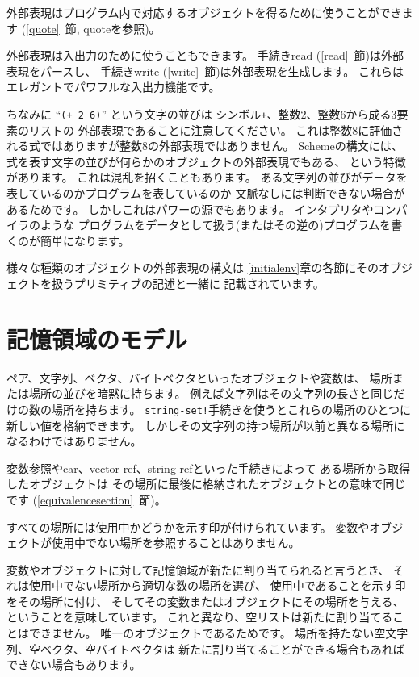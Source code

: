 外部表現はプログラム内で対応するオブジェクトを得るために使うことができます
(\ref{quote}~節, {\cf quote}を参照)。

外部表現は入出力のために使うこともできます。
手続き{\cf read} (\ref{read}~節)は外部表現をパースし、
手続き{\cf write} (\ref{write}~節)は外部表現を生成します。
これらはエレガントでパワフルな入出力機能です。

ちなみに ``{\tt(+ 2 6)}'' という文字の並びは
シンボル{\tt +}、整数2、整数6から成る3要素のリストの
外部表現であることに注意してください。
これは整数8に評価される式ではありますが整数8の外部表現ではありません。
Schemeの構文には、式を表す文字の並びが何らかのオブジェクトの外部表現でもある、
という特徴があります。
これは混乱を招くこともあります。
ある文字列の並びがデータを表しているのかプログラムを表しているのか
文脈なしには判断できない場合があるためです。
しかしこれはパワーの源でもあります。
インタプリタやコンパイラのような
プログラムをデータとして扱う(またはその逆の)プログラムを書くのが簡単になります。

様々な種類のオブジェクトの外部表現の構文は
\ref{initialenv}章の各節にそのオブジェクトを扱うプリミティブの記述と一緒に
記載されています。

\section{記憶領域のモデル}
\label{storagemodel}

ペア、文字列、ベクタ、バイトベクタといったオブジェクトや変数は、
場所または場所の並びを暗黙に持ちます。
例えば文字列はその文字列の長さと同じだけの数の場所を持ちます。
{\tt string-set!}手続きを使うとこれらの場所のひとつに新しい値を格納できます。
しかしその文字列の持つ場所が以前と異なる場所になるわけではありません。

変数参照や{\cf car}、{\cf vector-ref}、{\cf string-ref}といった手続きによって
ある場所から取得したオブジェクトは
その場所に最後に格納されたオブジェクトとの意味で同じです
(\ref{equivalencesection}~節)。

すべての場所には使用中かどうかを示す印が付けられています。
変数やオブジェクトが使用中でない場所を参照することはありません。

変数やオブジェクトに対して記憶領域が新たに割り当てられると言うとき、
それは使用中でない場所から適切な数の場所を選び、
使用中であることを示す印をその場所に付け、
そしてその変数またはオブジェクトにその場所を与える、
ということを意味しています。
これと異なり、空リストは新たに割り当てることはできません。
唯一のオブジェクトであるためです。
場所を持たない空文字列、空ベクタ、空バイトベクタは
新たに割り当てることができる場合もあればできない場合もあります。


